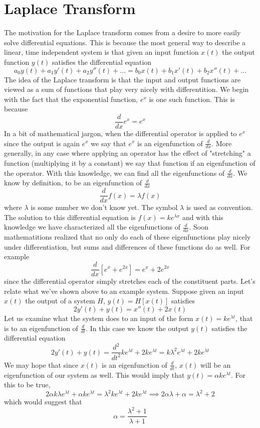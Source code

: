 \documentclass{article}
\begin{document}
    \section{Laplace Transform}
    The motivation for the Laplace transform comes from a desire to more easily solve differential equations. This is because the most general way to describe a linear, time independent system is that given an input function $x(t)$ the output function $y(t)$ satisfies the differential equation $$a_0y(t) + a_1y'(t) + a_2y''(t) + ... = b_0x(t) + b_1x'(t) + b_2x''(t) + ...$$ 
    The idea of the Laplace transform is that the input and output functions are viewed as a sum of functions that play very nicely with differentition. We begin with the fact that the exponential function, $e^x$ is one such function. This is because $$\frac{d}{dx} e^x = e^x$$ In a bit of mathematical jargon, when the differential operator is applied to $e^x$ since the output is again $e^x$ we say that $e^x$ is an eigenfunction of $\frac{d}{dx}$. More generally, in any case where applying an operator has the effect of "stretching" a function (multiplying it by a constant) we say that function if an eigenfunction of the operator. With this knowledge, we can find all the eigenfunctions of $\frac{d}{dx}$. We know by definition, to be an eigenfunction of $\frac{d}{dx}$ $$\frac{d}{dx}f(x) = \lambda f(x)$$ where $\lambda$ is some number we don't know yet. The symbol $\lambda$ is used as convention. The solution to this differential equation is $f(x) = ke^{\lambda x}$ and with this knowledge we have characterized all the eigenfunctions of $\frac{d}{dx}$. Soon mathematitions realized that no only do each of these eigenfunctions play nicely under differentiation, but sums and differences of these functions do as well. For example $$\frac{d}{dx} \left[ e^x + e^{2x} \right] = e^x + 2e^{2x}$$ since the differential operator simply stretches each of the constituent parts. 
    Let's relate what we've shown above to an example system. Suppose given an input $x(t)$ the output of a system $H$, $y(t) = H\left[ x(t) \right]$ satisfies $$2y'(t) + y(t) = x''(t) + 2x(t)$$
    Let us examine what the system does to an input of the form $x(t) = ke^{\lambda t}$, that is to an eigenfunction of $\frac{d}{dt}$. In this case we know the output $y(t)$ satisfies the differential equation $$2y'(t) + y(t) = \frac{d^2}{dt^2}ke^{\lambda t} + 2ke^{\lambda t} = k\lambda^2 e^{\lambda t} + 2ke^{\lambda t}$$ We may hope that since $x(t)$ is an eigenfunction of $\frac{d}{dt}$, $x(t)$ will be an eigenfunction of our system as well. This would imply that $y(t) = \alpha k e^{\lambda t}$. For this to be true, $$2\alpha k\lambda e^{\lambda t} + \alpha ke^{\lambda t} = \lambda^2 ke^{\lambda t} + 2ke^{\lambda t} \implies 2\alpha\lambda + \alpha = \lambda^2 + 2$$ which would suggest that $$\alpha = \frac{\lambda^2 + 1}{\lambda + 1}$$
\end{document}
